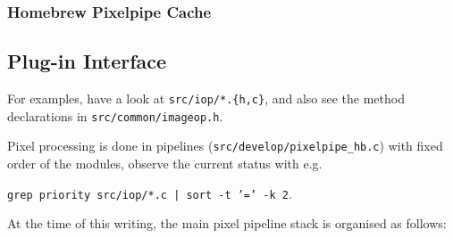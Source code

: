 \documentclass[a4paper,twoside]{scrartcl}
\newcommand{\code}[1]{\texttt{\color{codecol}#1}}
\begin{document}
\subsubsection{Homebrew Pixelpipe Cache}

\newpage
\subsection{Plug-in Interface}

For examples, have a look at \code{src/iop/*.\{h,c\}}, and also see the method declarations in \code{src/common/imageop.h}.

Pixel processing is done in pipelines (\code{src/develop/pixelpipe\_hb.c}) with fixed order of the modules,
observe the current status with e.g.

\code{grep priority src/iop/*.c | sort -t '=' -k 2}.

At the time of this writing, the main pixel pipeline stack is organised as follows:

\medskip
\end{document}
